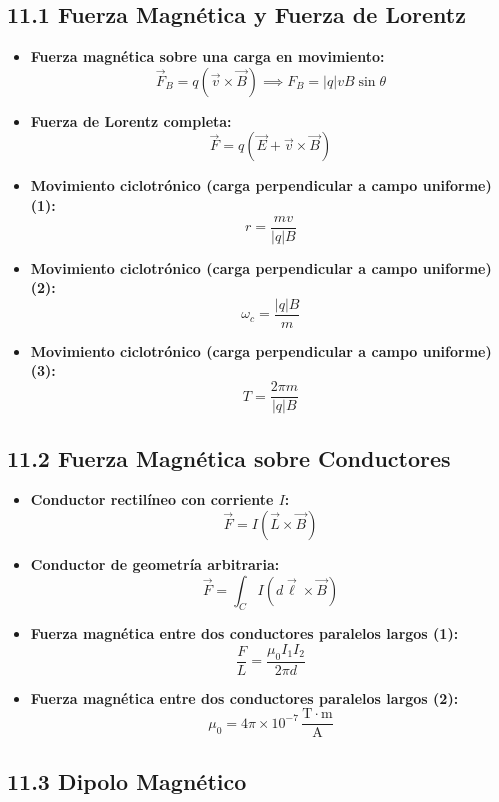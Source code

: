 \documentclass[11pt,a4paper]{article}
\begin{document}
\subsection*{11.1 Fuerza Magnética y Fuerza de Lorentz}

\begin{itemize}
  \item \textbf{Fuerza magnética sobre una carga en movimiento:}
  \[
    \vec{F}_B = q (\vec{v} \times \vec{B}) \implies F_B = |q| v B \sin\theta
  \]
  \item \textbf{Fuerza de Lorentz completa:}
  \[
    \vec{F} = q (\vec{E} + \vec{v} \times \vec{B})
  \]
  \item \textbf{Movimiento ciclotrónico (carga perpendicular a campo uniforme) (1):}
  \[
    r = \frac{m v}{|q| B}
  \]
  \item \textbf{Movimiento ciclotrónico (carga perpendicular a campo uniforme) (2):}
  \[
    \omega_c = \frac{|q| B}{m}
  \]
  \item \textbf{Movimiento ciclotrónico (carga perpendicular a campo uniforme) (3):}
  \[
    T = \frac{2\pi m}{|q| B}
  \]
\end{itemize}

\subsection*{11.2 Fuerza Magnética sobre Conductores}

\begin{itemize}
  \item \textbf{Conductor rectilíneo con corriente $I$:}
  \[
    \vec{F} = I (\vec{L} \times \vec{B})
  \]
  \item \textbf{Conductor de geometría arbitraria:}
  \[
    \vec{F} = \int_C I (d\vec{\ell} \times \vec{B})
  \]
  \item \textbf{Fuerza magnética entre dos conductores paralelos largos (1):}
  \[
    \frac{F}{L} = \frac{\mu_0 I_1 I_2}{2\pi d}
  \]
  \item \textbf{Fuerza magnética entre dos conductores paralelos largos (2):}
  \[
    \mu_0 = 4\pi \times 10^{-7} \, \frac{\mathrm{T}\cdot\mathrm{m}}{\mathrm{A}}
  \]
\end{itemize}

\subsection*{11.3 Dipolo Magnético}
\end{document}
